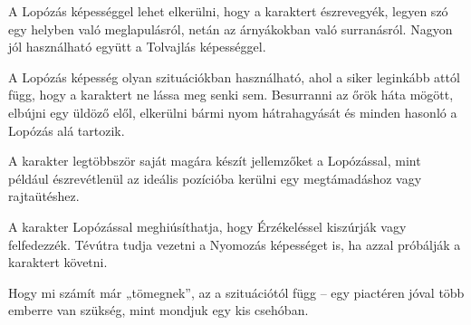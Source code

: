 
A Lopózás képességgel lehet elkerülni, hogy a karaktert észrevegyék, legyen szó egy helyben való meglapulásról, netán az árnyákokban való surranásról. Nagyon jól használható együtt a Tolvajlás képességgel.

\overcome A Lopózás képesség olyan szituációkban használható, ahol a siker leginkább attól függ, hogy a karaktert ne lássa meg senki sem. Besurranni az őrök háta mögött, elbújni egy üldöző elől, elkerülni bármi nyom hátrahagyását és minden hasonló a Lopózás alá tartozik.

\advantage A karakter legtöbbször saját magára készít jellemzőket a Lopózással, mint például észrevétlenül az ideális pozícióba kerülni egy megtámadáshoz vagy rajtaütéshez.

\noattack

 A karakter Lopózással meghiúsíthatja, hogy Érzékeléssel kiszúrják vagy felfedezzék. Tévútra tudja vezetni a Nyomozás képességet is, ha azzal próbálják a karaktert követni.


Hogy mi számít már „tömegnek”, az a szituációtól függ -- egy piactéren jóval több emberre van szükség, mint mondjuk egy kis csehóban.


